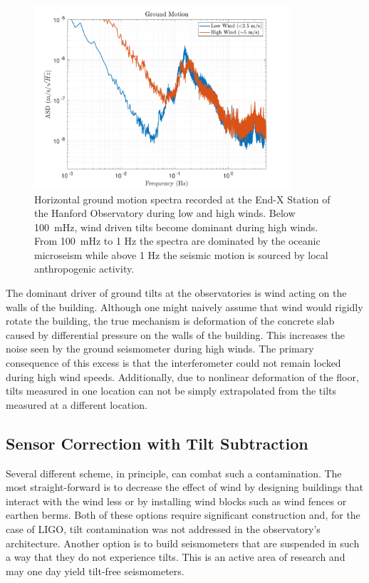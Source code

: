 \documentclass [12pt, proquest]{uwthesis}[2019]
\begin{document}
\begin{figure}[!h]
\begin{center}
\includegraphics[width=0.85\textwidth]{windComp2.pdf}
\caption[Ground motion spectra during low and high winds]{Horizontal ground motion spectra recorded at the End-X Station of the Hanford Observatory during low and high winds. Below 100~mHz, wind driven tilts become dominant during high winds. From 100~mHz to 1 Hz the spectra are dominated by the oceanic microseism while above 1 Hz the seismic motion is sourced by local anthropogenic activity.}
\label{wind}
\end{center}
\end{figure}

The dominant driver of ground tilts at the observatories is wind acting on the walls of the building. Although one might naively assume that wind would rigidly rotate the building, the true mechanism is deformation of the concrete slab caused by differential pressure on the walls of the building. This increases the noise seen by the ground seismometer during high winds. The primary consequence of this excess is that the interferometer could not remain locked during high wind speeds. Additionally, due to nonlinear deformation of the floor, tilts measured in one location can not be simply extrapolated from the tilts measured at a different location.

\subsection{Sensor Correction with Tilt Subtraction}

\quad Several different scheme, in principle, can combat such a contamination. The most straight-forward is to decrease the effect of wind by designing buildings that interact with the wind less or by installing wind blocks such as wind fences or earthen berms. Both of these options require significant construction and, for the case of LIGO, tilt contamination was not addressed in the observatory's architecture. Another option is to build seismometers that are suspended in such a way that they do not experience tilts. This is an active area of research and may one day yield tilt-free seismometers.~\cite{tiltFree}
\end{document}
